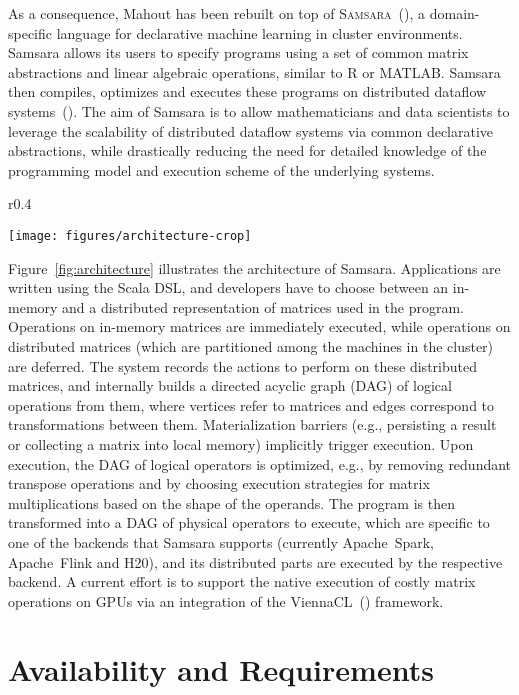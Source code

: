 \documentclass[twoside,11pt]{article}
\begin{document}
As a consequence, Mahout has been rebuilt on top of \textsc{Samsara}~(\cite{Lyubimov2016}), a domain-specific language for declarative machine learning in cluster environments. Samsara allows its users to specify programs using a set of common matrix abstractions and linear algebraic operations, similar to \textsc{R} or \textsc{MATLAB}. Samsara then compiles, optimizes and executes these programs on distributed dataflow systems~(\cite{Schelter2016}). The aim of Samsara is to allow mathematicians and data scientists to leverage the scalability of distributed dataflow systems via common declarative abstractions, while drastically reducing the need for detailed knowledge of the programming model and execution scheme of the underlying systems.
%
\begin{wrapfigure}{r}{0.4\textwidth}
  \begin{center}
    \texttt{[image: figures/architecture-crop]}
    \caption{Samsara architecture.\label{fig:architecture}}
  \end{center}
\end{wrapfigure}
%

Figure~\ref{fig:architecture} illustrates the architecture of Samsara. Applications are written using the Scala DSL, and developers have to choose between an in-memory and a distributed representation of matrices used in the program. Operations on in-memory matrices are immediately executed, while operations on distributed matrices (which are partitioned among the machines in the cluster) are deferred. The system records the actions to perform on these distributed matrices, and internally builds a directed acyclic graph (DAG) of logical operations from them, where vertices refer to matrices and edges correspond to transformations between them. Materialization barriers (e.g., persisting a result or collecting a matrix into local memory) implicitly trigger execution. Upon execution, the DAG of logical operators is optimized, e.g., by removing redundant transpose operations and by choosing execution strategies for matrix multiplications based on the shape of the operands. The program is then transformed into a DAG of physical operators to execute, which are specific to one of the backends that Samsara supports (currently Apache~Spark, Apache~Flink and H20), and its distributed parts are executed by the respective backend. A current effort is to support the native execution of costly matrix operations on GPUs via an integration of the ViennaCL~(\cite{Rupp2010}) framework.

\section{Availability and Requirements}
\end{document}
